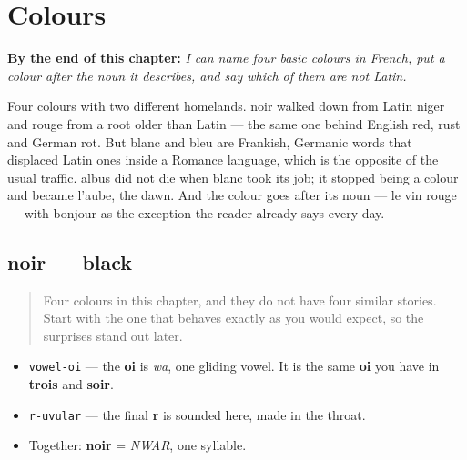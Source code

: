 
\chapter{Colours}
\label{ch:colours}

\begin{chapteropening}
\textbf{By the end of this chapter:} \emph{I can name four basic colours in French, put a colour after the noun it describes, and say which of them are not Latin.}

Four colours with two different homelands. noir walked down from Latin niger and rouge from a root older than Latin — the same one behind English red, rust and German rot. But blanc and bleu are Frankish, Germanic words that displaced Latin ones inside a Romance language, which is the opposite of the usual traffic. albus did not die when blanc took its job; it stopped being a colour and became l'aube, the dawn. And the colour goes after its noun — le vin rouge — with bonjour as the exception the reader already says every day.
\end{chapteropening}

\section[noir]{noir — black}

\label{lesson:FR-C13-noir}



\begin{quote}
Four colours in this chapter, and they do not have four similar stories. Start with the one that behaves exactly as you would expect, so the surprises stand out later.
\end{quote}

\begin{sounds}
\begin{itemize}
\raggedright
  \item \texttt{vowel-oi} — the \textbf{oi} is \emph{wa}, one gliding vowel. It is the same \textbf{oi} you have in \textbf{trois} and \textbf{soir}.
  \item \texttt{r-uvular} — the final \textbf{r} is sounded here, made in the throat.
  \item Together: \textbf{noir} = \emph{NWAR}, one syllable.
\end{itemize}
\end{sounds}

